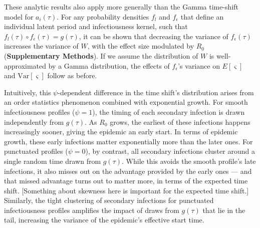 These analytic results also apply more generally than the Gamma time-shift model for $a_i(\tau)$. For any probability densities $f_l$ and $f_\epsilon$ that define an individual latent period and infectiousness kernel, such that $f_l (\tau)\circ f_\epsilon(\tau) = g(\tau)$, it can be shown that decreasing the variance of $f_\epsilon(\tau)$ increases the variance of $W$, with the effect size modulated by $R_0$ ({\bf Supplementary Methods}). If we assume the distribution of $W$ is well-approximated by a Gamma distribution, the effects of $f_\epsilon$'s variance on $E[\varsigma]$ and $\text{Var}[\varsigma]$ follow as before. 

Intuitively, this $\psi$-dependent difference in the time shift's distribution arises from an order statistics phenomenon combined with exponential growth. For smooth infectiousness profiles ($\psi = 1$), the timing of each secondary infection is drawn independently from $g(\tau)$. As $R_0$ grows, the earliest of these infections happens increasingly sooner, giving the epidemic an early start. In terms of epidemic growth, these early infections matter exponentially more than the later ones. For punctuated profiles ($\psi = 0$), by contrast, all secondary infections cluster around a single random time drawn from $g(\tau)$. While this avoids the smooth profile's late infections, it also misses out on the advantage provided by the early ones --- and that missed advantage turns out to matter more, in terms of the expected time shift. [Something about skewness here is important for the expected time shift.] Similarly, the tight clustering of secondary infections for punctuated infectiousness profiles amplifies the impact of draws from $g(\tau)$ that lie in the tail, increasing the variance of the epidemic's effective start time. 


